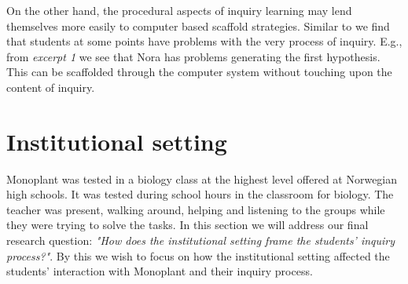On the other hand, the procedural aspects of inquiry learning may lend themselves more easily to computer based scaffold strategies. Similar to \citet{kluge2010simulation} we find that students at some points have problems with the very process of inquiry. E.g., from \emph{excerpt 1} we see that Nora has problems generating the first hypothesis. This can be scaffolded through the computer system without touching upon the content of inquiry. 














\section{Institutional setting}
Monoplant was tested in a biology class at the highest level offered at Norwegian high schools. It was tested during school hours in the classroom for biology. The teacher was present, walking around, helping and listening to the groups while they were trying to solve the tasks. In this section we will address our final research question: \emph{"How does the institutional setting frame the students' inquiry process?"}.
By this we wish to focus on how the institutional setting affected the students' interaction with Monoplant and their inquiry process. 

